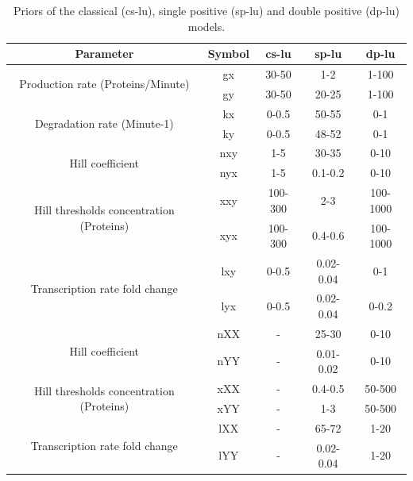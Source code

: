 \begin{table}[htpb]
\centering
\caption{Priors of the classical (\acrshort{cs-lu}), single positive (\acrshort{sp-lu}) and double positive (\acrshort{dp-lu}) models.}
\label{tab:lu_all}
\begin{tabular}{@{}ccccc@{}}
\toprule
Parameter                                            & Symbol & \acrshort{cs-lu}        & \acrshort{sp-lu}         & \acrshort{dp-lu}       \\ \midrule
\multirow{2}{4cm}{Production rate (Proteins/Minute)}                & gx        & 30-50   & 1-2       & 1-100    \\
                                                & gy        & 30-50   & 20-25     & 1-100    \\[4pt]
\multirow{2}{4cm}{Degradation rate (Minute-1)}               & kx        & 0-0.5   & 50-55     & 0-1      \\
                                                & ky        & 0-0.5   & 48-52     & 0-1      \\[4pt]
\multirow{2}{4cm}{Hill coefficient}               & nxy       & 1-5     & 30-35     & 0-10     \\
                                                & nyx       & 1-5     & 0.1-0.2   & 0-10     \\[4pt]
\multirow{2}{4cm}{Hill thresholds concentration (Proteins)}  & xxy       & 100-300 & 2-3       & 100-1000 \\
                                                & xyx       & 100-300 & 0.4-0.6   & 100-1000 \\[4pt]
\multirow{2}{4cm}{Transcription rate fold change} & lxy       & 0-0.5   & 0.02-0.04 & 0-1      \\
                                                & lyx       & 0-0.5   & 0.02-0.04 & 0-0.2    \\[4pt]
\multirow{2}{4cm}{Hill coefficient}               & nXX       & -       & 25-30     & 0-10     \\
                                                & nYY       & -       & 0.01-0.02 & 0-10     \\[4pt]
\multirow{2}{4cm}{Hill thresholds concentration (Proteins)}  & xXX       & -       & 0.4-0.5   & 50-500   \\
                                                & xYY       & -       & 1-3       & 50-500   \\[4pt]
\multirow{2}{4cm}{Transcription rate fold change} & lXX       & -       & 65-72     & 1-20     \\
                                                & lYY       & -       & 0.02-0.04 & 1-20     \\ \hline
\end{tabular}
\end{table}



